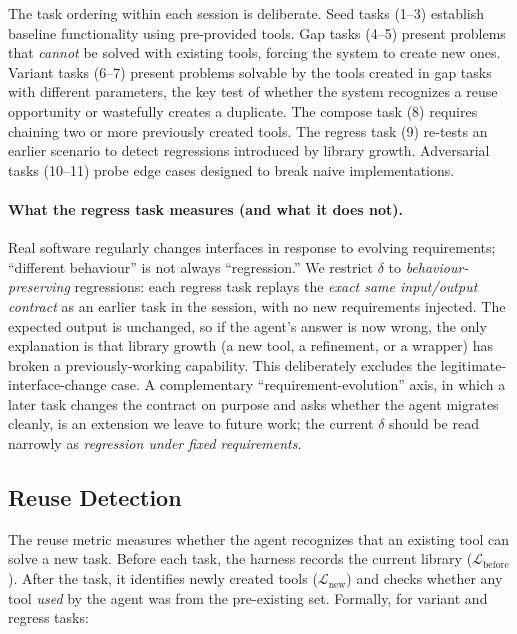 \documentclass[sigconf,anonymous,review,natbib=false]{acmart}
\begin{document}
The task ordering within each session is deliberate. Seed tasks (1--3) establish baseline functionality using pre-provided tools. Gap tasks (4--5) present problems that \emph{cannot} be solved with existing tools, forcing the system to create new ones. Variant tasks (6--7) present problems solvable by the tools created in gap tasks with different parameters, the key test of whether the system recognizes a reuse opportunity or wastefully creates a duplicate. The compose task (8) requires chaining two or more previously created tools. The regress task (9) re-tests an earlier scenario to detect regressions introduced by library growth. Adversarial tasks (10--11) probe edge cases designed to break naive implementations.

\paragraph{What the regress task measures (and what it does not).}
Real software regularly changes interfaces in response to evolving requirements; ``different behaviour'' is not always ``regression.'' We restrict $\delta$ to \emph{behaviour-preserving} regressions: each regress task replays the \emph{exact same input/output contract} as an earlier task in the session, with no new requirements injected. The expected output is unchanged, so if the agent's answer is now wrong, the only explanation is that library growth (a new tool, a refinement, or a wrapper) has broken a previously-working capability. This deliberately excludes the legitimate-interface-change case. A complementary ``requirement-evolution'' axis, in which a later task changes the contract on purpose and asks whether the agent migrates cleanly, is an extension we leave to future work; the current $\delta$ should be read narrowly as \emph{regression under fixed requirements}.

\subsection{Reuse Detection}
\label{sec:reuse}

The reuse metric measures whether the agent recognizes that an existing tool can solve a new task. Before each task, the harness records the current library ($\mathcal{L}_{\text{before}}$). After the task, it identifies newly created tools ($\mathcal{L}_{\text{new}}$) and checks whether any tool \emph{used} by the agent was from the pre-existing set. Formally, for variant and regress tasks:
\end{document}
